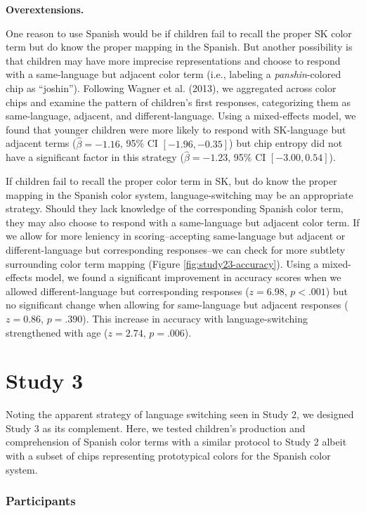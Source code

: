 \documentclass[
  english,
  ,man,floatsintext]{apa6}
\begin{document}
\textbf{Overextensions.}

One reason to use Spanish would be if children fail to recall the proper SK color term but do know the proper mapping in the Spanish. But another possibility is that children may have more imprecise representations and choose to respond with a same-language but adjacent color term (i.e., labeling a \emph{panshin}-colored chip as \enquote{joshin}). Following Wagner et al. (2013), we aggregated across color chips and examine the pattern of children's first responses, categorizing them as same-language, adjacent, and different-language. Using a mixed-effects model, we found that younger children were more likely to respond with SK-language but adjacent terms (\(\hat{\beta} = -1.16\), 95\% CI \([-1.96, -0.35]\)) but chip entropy did not have a significant factor in this strategy (\(\hat{\beta} = -1.23\), 95\% CI \([-3.00, 0.54]\)).

If children fail to recall the proper color term in SK, but do know the proper mapping in the Spanish color system, language-switching may be an appropriate strategy. Should they lack knowledge of the corresponding Spanish color term, they may also choose to respond with a same-language but adjacent color term. If we allow for more leniency in scoring--accepting same-language but adjacent or different-language but corresponding responses--we can check for more subtlety surrounding color term mapping (Figure \ref{fig:study23-accuracy}). Using a mixed-effects model, we found a significant improvement in accuracy scores when we allowed different-language but corresponding responses (\(z = 6.98\), \(p < .001\)) but no significant change when allowing for same-language but adjacent responses (\(z = 0.86\), \(p = .390\)). This increase in accuracy with language-switching strengthened with age (\(z = 2.74\), \(p = .006\)).

\hypertarget{study-3}{%
\section{Study 3}\label{study-3}}

Noting the apparent strategy of language switching seen in Study 2, we designed Study 3 as its complement. Here, we tested children's production and comprehension of Spanish color terms with a similar protocol to Study 2 albeit with a subset of chips representing prototypical colors for the Spanish color system.

\hypertarget{participants-2}{%
\subsubsection{Participants}\label{participants-2}}
\end{document}
